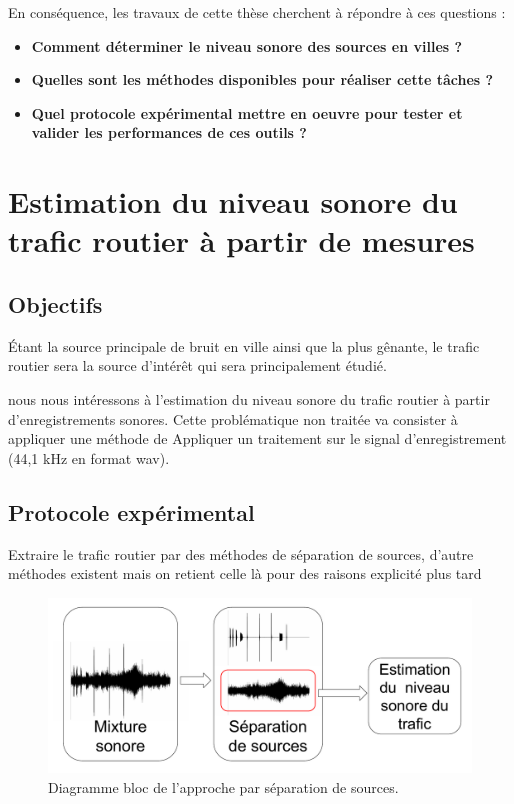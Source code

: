 En conséquence, les travaux de cette thèse cherchent à répondre à ces questions : 
\begin{itemize}
\item \textbf{Comment déterminer le niveau sonore des sources en villes ?}
\item \textbf{Quelles sont les méthodes disponibles pour réaliser cette tâches ?}
\item \textbf{Quel protocole expérimental mettre en oeuvre pour tester et valider les performances de ces outils ?}
\end{itemize}


\section{Estimation du niveau sonore du trafic routier à partir de mesures}

\subsection{Objectifs}
Étant la source principale de bruit en ville ainsi que la plus gênante, le trafic routier sera la source d'intérêt qui sera principalement étudié. 

nous nous intéressons à l'estimation du niveau sonore du trafic routier à partir d'enregistrements sonores.
Cette problématique non traitée va consister à appliquer une méthode de 
Appliquer un traitement sur le signal d'enregistrement (44,1 kHz en format wav).

\subsection{Protocole expérimental}

Extraire le trafic routier par des méthodes de séparation de sources, d'autre méthodes existent mais on retient celle là pour des raisons explicité plus tard

\begin{figure}[t]
\centering
\includegraphics[width=0.7\linewidth]{./figures/NMF/bloc_diagram_source_separation.pdf}
\caption{Diagramme bloc de l'approche par séparation de sources.}
\end{figure}


